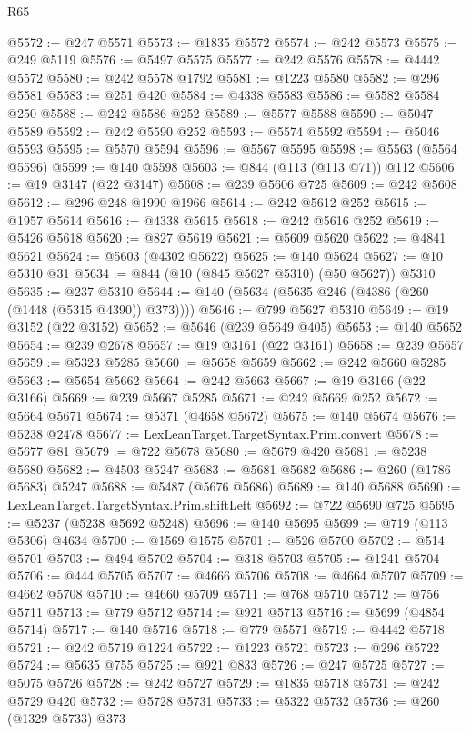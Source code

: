 \begin{lexlean}{R65}
\begin{coremodule}
{@5572 := @247 @5571
@5573 := @1835 @5572
@5574 := @242 @5573
@5575 := @249 @5119
@5576 := @5497 @5575
@5577 := @242 @5576
@5578 := @4442 @5572
@5580 := @242 @5578 @1792
@5581 := @1223 @5580
@5582 := @296 @5581
@5583 := @251 @420
@5584 := @4338 @5583
@5586 := @5582 @5584 @250
@5588 := @242 @5586 @252
@5589 := @5577 @5588
@5590 := @5047 @5589
@5592 := @242 @5590 @252
@5593 := @5574 @5592
@5594 := @5046 @5593
@5595 := @5570 @5594
@5596 := @5567 @5595
@5598 := @5563 (@5564 @5596)
@5599 := @140 @5598
@5603 := @844 (@113 (@113 @71)) @112
@5606 := @19 @3147 (@22 @3147)
@5608 := @239 @5606 @725
@5609 := @242 @5608
@5612 := @296 @248 @1990 @1966
@5614 := @242 @5612 @252
@5615 := @1957 @5614
@5616 := @4338 @5615
@5618 := @242 @5616 @252
@5619 := @5426 @5618
@5620 := @827 @5619
@5621 := @5609 @5620
@5622 := @4841 @5621
@5624 := @5603 (@4302 @5622)
@5625 := @140 @5624
@5627 := @10 @5310 @31
@5634 := @844 (@10 (@845 @5627 @5310) (@50 @5627)) @5310
@5635 := @237 @5310
@5644 := @140 (@5634 (@5635 @246 (@4386 (@260 (@1448 (@5315 @4390)) @373))))
@5646 := @799 @5627 @5310
@5649 := @19 @3152 (@22 @3152)
@5652 := @5646 (@239 @5649 @405)
@5653 := @140 @5652
@5654 := @239 @2678
@5657 := @19 @3161 (@22 @3161)
@5658 := @239 @5657
@5659 := @5323 @5285
@5660 := @5658 @5659
@5662 := @242 @5660 @5285
@5663 := @5654 @5662
@5664 := @242 @5663
@5667 := @19 @3166 (@22 @3166)
@5669 := @239 @5667 @5285
@5671 := @242 @5669 @252
@5672 := @5664 @5671
@5674 := @5371 (@4658 @5672)
@5675 := @140 @5674
@5676 := @5238 @2478
@5677 := LexLeanTarget.TargetSyntax.Prim.convert
@5678 := @5677 @81
@5679 := @722 @5678
@5680 := @5679 @420
@5681 := @5238 @5680
@5682 := @4503 @5247
@5683 := @5681 @5682
@5686 := @260 (@1786 @5683) @5247
@5688 := @5487 (@5676 @5686)
@5689 := @140 @5688
@5690 := LexLeanTarget.TargetSyntax.Prim.shiftLeft
@5692 := @722 @5690 @725
@5695 := @5237 (@5238 @5692 @5248)
@5696 := @140 @5695
@5699 := @719 (@113 @5306) @4634
@5700 := @1569 @1575
@5701 := @526 @5700
@5702 := @514 @5701
@5703 := @494 @5702
@5704 := @318 @5703
@5705 := @1241 @5704
@5706 := @444 @5705
@5707 := @4666 @5706
@5708 := @4664 @5707
@5709 := @4662 @5708
@5710 := @4660 @5709
@5711 := @768 @5710
@5712 := @756 @5711
@5713 := @779 @5712
@5714 := @921 @5713
@5716 := @5699 (@4854 @5714)
@5717 := @140 @5716
@5718 := @779 @5571
@5719 := @4442 @5718
@5721 := @242 @5719 @1224
@5722 := @1223 @5721
@5723 := @296 @5722
@5724 := @5635 @755
@5725 := @921 @833
@5726 := @247 @5725
@5727 := @5075 @5726
@5728 := @242 @5727
@5729 := @1835 @5718
@5731 := @242 @5729 @420
@5732 := @5728 @5731
@5733 := @5322 @5732
@5736 := @260 (@1329 @5733) @373
}
\end{coremodule}
\end{lexlean}
